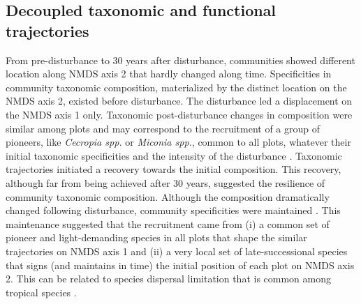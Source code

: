 \documentclass[fleqn,10pt]{ArtEcoFoG} %
\begin{document}
\hypertarget{decoupled-taxonomic-and-functional-trajectories}{%
\subsection{Decoupled taxonomic and functional trajectories}\label{decoupled-taxonomic-and-functional-trajectories}}

\color{red}From pre-disturbance to 30 years after disturbance, communities showed different location along NMDS axis 2 that hardly changed along time.
Specificities in community taxonomic composition, materialized by the distinct location on the NMDS axis 2, existed before disturbance.
The disturbance led a displacement on the NMDS axis 1 only.\color{black}
Taxonomic \color{red} post-disturbance \color{black} changes in composition were similar among plots and may correspond to the recruitment of a group of pioneers, like \emph{Cecropia spp.} or \emph{Miconia spp.}, common to all plots, whatever their initial taxonomic \color{red}specificities \color{black} and the intensity of the disturbance \citep{Denslow2000, Bongers2009}.
Taxonomic trajectories initiated a recovery towards the initial composition.
This recovery, although far from being achieved after 30 years, suggested the resilience of community taxonomic composition.
\color{red}Although the composition dramatically changed following disturbance, community specificities were maintained \citep{Folke2006}.
This maintenance suggested that the recruitment came from (i) a common set of pioneer and light-demanding species in all plots that shape the similar trajectories on NMDS axis 1 and (ii) a very local set of late-successional species that signs (and maintains in time) the initial position of each plot on NMDS axis 2. This can be related to species dispersal limitation that is common among tropical species \citep{Svenning2005}.\color{black}
\end{document}
